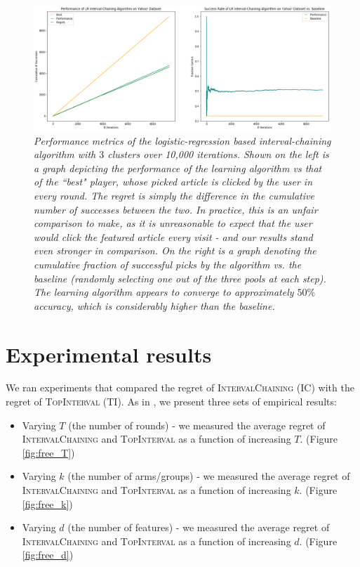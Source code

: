 \documentclass[11pt]{article}
\begin{document}
\begin{figure}
\includegraphics[width=\textwidth]{yahoo-interval-chaining.png}
\caption{\emph{Performance metrics of the logistic-regression based interval-chaining algorithm with $3$ clusters over 10,000 iterations. Shown on the left is a graph depicting the performance of the learning algorithm vs that of the ``best" player, whose picked article is clicked by the user in every round. The regret is simply the difference in the cumulative number of successes between the two. In practice, this is an unfair comparison to make, as it is unreasonable to expect that the user would click the featured article every visit - and our results stand even stronger in comparison. On the right is a graph denoting the cumulative fraction of successful picks by the algorithm vs. the baseline (randomly selecting one out of the three pools at each step). The learning algorithm appears to converge to approximately $50\%$ accuracy, which is considerably higher than the baseline.} \label{fig:yahoo}}
\end{figure}

\section{Experimental results}

We ran experiments that compared the regret of \textsc{IntervalChaining} (IC) with the regret of \textsc{TopInterval} (TI). As in , we present three sets of empirical results: 
\begin{itemize}
	\item Varying $T$ (the number of rounds) - we measured the average regret of \textsc{IntervalChaining} and \textsc{TopInterval} as a function of increasing $T$. (Figure \ref{fig:free_T})
	\item Varying $k$ (the number of arms/groups) - we measured the average regret of \textsc{IntervalChaining} and \textsc{TopInterval} as a function of increasing $k$. (Figure \ref{fig:free_k})
	\item Varying $d$ (the number of features) - we measured the average regret of \textsc{IntervalChaining} and \textsc{TopInterval} as a function of increasing $d$. (Figure \ref{fig:free_d})
\end{itemize} 
\end{document}
